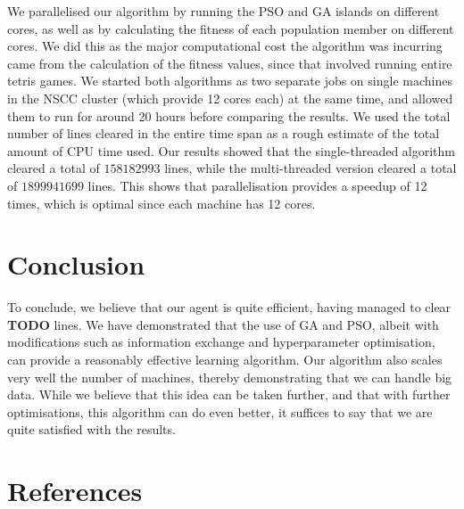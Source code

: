 \documentclass[12pt]{article}
\begin{document}
	We parallelised our algorithm by running the PSO and GA islands on different cores,
	as well as by calculating the fitness of each population member on different cores.
	We did this as the major computational cost the algorithm was incurring came from
	the calculation of the fitness values, since that involved running entire tetris games. We started both algorithms as two separate jobs on single machines
	in the NSCC cluster (which provide 12 cores each) at the same time, and allowed them to run for around 20
	hours before comparing the results. We used the total number of lines cleared
	in the entire time span as a rough estimate of the total amount of
	CPU time used. Our results showed that the single-threaded algorithm cleared
	a total of $158182993$ lines, while the multi-threaded version cleared a total
	of $1899941699$ lines. This shows that parallelisation provides a speedup of 12 times,
	which is optimal since each machine has 12 cores.

	\vspace{-0.3cm}
    \section{Conclusion}
	To conclude, we believe that our agent is quite efficient, having managed to clear \textbf{TODO} lines.
	We have demonstrated that the use of GA and PSO, albeit with modifications such as
	information exchange and hyperparameter optimisation, can provide
	a reasonably effective learning algorithm. Our algorithm also scales very well the number
	of machines, thereby demonstrating that we can handle big data. While we believe that this
	idea can be taken further, and that with further optimisations, this algorithm can do even better,
	it suffices to say that we are quite satisfied with the results.


	\vspace{-0.3cm}
    \section{References}
	
	
\end{document}

